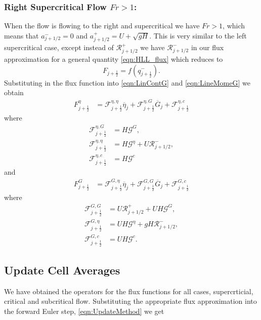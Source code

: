 \subsubsection{Right Supercritical Flow $Fr > 1$:}
When the flow is flowing to the right and supercritical we have $ Fr > 1 $, which means that $a^-_{j+ 1/2} = 0$ and $a^+_{j+ 1/2} =  U + \sqrt{g H}$. This is very similar to the left supercritical case, except instead of $\mathcal{R}^+_{j+1/2}$ we have $\mathcal{R}^-_{j+1/2}$ in our flux approximation for a general quantity \eqref{eqn:HLL_flux} which reduces to
\begin{equation*}
F_{j+\frac{1}{2}} = f\left(q^-_{j+\frac{1}{2}}\right).
\end{equation*}
Substituting in the flux function into \eqref{eqn:LinContG} and \eqref{eqn:LineMomeG} we obtain
	\begin{align*}
	F^\eta_{j+\frac{1}{2}} &= \mathcal{F}^{\eta, \eta}_{j+\frac{1}{2}} \overline{\eta}_{j} + \mathcal{F}^{\eta, G}_{j+\frac{1}{2}} \overline{G}_{j} + \mathcal{F}^{\eta, c}_{j+\frac{1}{2}}
	\end{align*}
	where
	\begin{align*}
	\mathcal{F}^{\eta, G}_{j+\frac{1}{2}} &=  H \mathcal{G}^G,\\
	\mathcal{F}^{\eta, \eta}_{j+\frac{1}{2}} &=  H \mathcal{G}^{\eta} + U \mathcal{R}^-_{j+1/2},\\
	\mathcal{F}^{\eta, c}_{j+\frac{1}{2}} &=  H\mathcal{G}^c
	\end{align*}
and
	\begin{align*}
	F^G_{j+\frac{1}{2}} &= \mathcal{F}^{G, \eta}_{j+\frac{1}{2}} \overline{\eta}_{j} + \mathcal{F}^{G, G}_{j+\frac{1}{2}} \overline{G}_{j} + \mathcal{F}^{G, c}_{j+\frac{1}{2}}
	\end{align*}
	where
	\begin{align*}
	\mathcal{F}^{G, G}_{j+\frac{1}{2}} &=  U\mathcal{R}^+_{j+1/2}  +  UH \mathcal{G}^G, \\
	\mathcal{F}^{G, \eta}_{j+\frac{1}{2}} &=  UH \mathcal{G}^{\eta} + gH \mathcal{R}^-_{j+1/2},\\
	\mathcal{F}^{G, c}_{j+\frac{1}{2}} &=  UH\mathcal{G}^c.
	\end{align*}



\subsection{Update Cell Averages}
We have obtained the operators for the flux functions for all cases, supercrticial, critical and subcritical flow. Substituting the appropriate flux approximation into the forward Euler step, \eqref{eqn:UpdateMethod} we get

